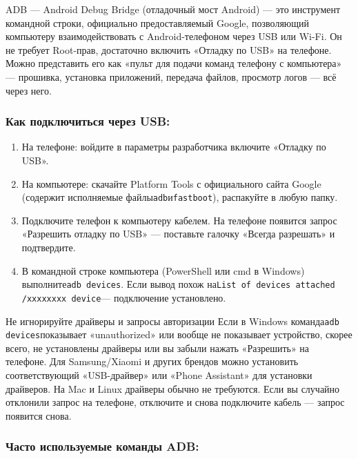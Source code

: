 ADB — Android Debug Bridge (отладочный мост Android) — это инструмент командной строки, официально предоставляемый Google, позволяющий компьютеру взаимодействовать с Android-телефоном через USB или Wi-Fi. Он не требует Root-прав, достаточно включить «Отладку по USB» на телефоне. Можно представить его как «пульт для подачи команд телефону с компьютера» — прошивка, установка приложений, передача файлов, просмотр логов — всё через него.

\subsubsection*{Как подключиться через USB:}

\begin{enumerate}
  \item На телефоне: войдите в параметры разработчика включите «Отладку по USB».
  \item На компьютере: скачайте Platform Tools с официального сайта Google (содержит исполняемые файлы\texttt{adb}и\texttt{fastboot}), распакуйте в любую папку.
  \item Подключите телефон к компьютеру кабелем. На телефоне появится запрос «Разрешить отладку по USB» — поставьте галочку «Всегда разрешать» и подтвердите.
  \item В командной строке компьютера (PowerShell или cmd в Windows) выполните\texttt{adb devices}. Если вывод похож на\texttt{List of devices attached /\allowbreak  xxxxxxxx device}— подключение установлено.
\end{enumerate}

\begin{tcbwarn}{Не игнорируйте драйверы и запросы авторизации}
Если в Windows команда\texttt{adb devices}показывает «unauthorized» или вообще не показывает устройство, скорее всего, не установлены драйверы или вы забыли нажать «Разрешить» на телефоне. Для Samsung/Xiaomi и других брендов можно установить соответствующий «USB-драйвер» или «Phone Assistant» для установки драйверов. На Mac и Linux драйверы обычно не требуются. Если вы случайно отклонили запрос на телефоне, отключите и снова подключите кабель — запрос появится снова.

\end{tcbwarn}

\subsubsection*{Часто используемые команды ADB:}

